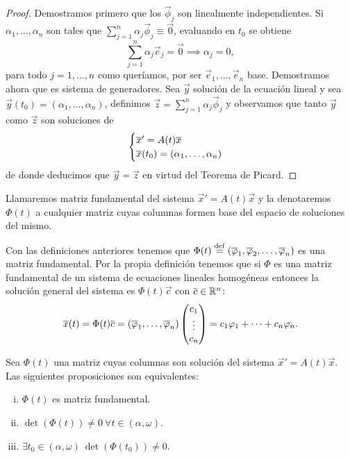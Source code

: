 \documentclass[../ecuaciones_diferenciales.tex]{subfiles}
\begin{document}
\begin{proof}
	Demostramos primero que los \(\vec{\phi}_j\) son linealmente independientes. 
	Si \(\alpha_1, \dots, \alpha_n\) son tales que 
	\(\sum_{j = 1}^n \alpha_j \vec{\phi}_j \equiv \vec{0}\),
	evaluando en \(t_0\) se obtiene
	\[\sum_{j = 1}^n \alpha_j \vec{e}_j = \vec{0} \implies \alpha_j = 0,\]
	para todo \(j = 1, \dots, n\) como queríamos, por ser 
	\(\vec{e}_1, \dots, \vec{e}_n\) base. 
	Demostramos ahora que es sistema de generadores. Sea \(\vec{y}\) solución
	de la ecuación lineal y sea 
	\(\vec{y}(t_0) = (\alpha_1, \dots, \alpha_n)\),
	definimos \(\vec{z} = \sum_{j = 1}^n \alpha_j \vec{\phi}_j\) y observamos 
	que tanto \(\vec{y}\) como \(\vec{z}\) son soluciones de
	\[\begin{cases}
		\overline{x}' = A(t)\overline{x} \\
		\overline{x}(t_0) = (\alpha_1, \dots, \alpha_n)\end{cases}\]
	de donde deducimos que \(\vec{y} = \vec{z}\) en virtud del 
	Teorema de Picard.
\end{proof}

\begin{definition}
	Llamaremos matriz fundamental del sistema 
	\(\vec{x}' = A(t)\vec{x}\) y la denotaremos
	\(\Phi(t)\) a cualquier matriz cuyas columnas formen base del espacio de
	soluciones del mismo.
\end{definition}

Con las definiciones anteriores tenemos que
\(\Phi(t) \overset{\operatorname{def}}{=} (\overline{\varphi}_1, \overline{\varphi}_2, \dots, \overline{\varphi}_n)\) es una matriz 
fundamental. Por la propia definición tenemos que si \(\Phi\) es una matriz 
fundamental de un sistema de ecuaciones lineales homogéneas entonces la solución 
general del sistema es \(\Phi(t)\vec{c}\) con \(\overline{c} \in \mathbb{R}^n\):
\[\overline{x}(t) = \Phi(t) \overline{c} 
	= (\overline{\varphi}_1, \dots, \overline{\varphi}_n) \begin{pmatrix}c_1 \\ \vdots \\ c_n\end{pmatrix} =
	c_1\varphi_1 + \cdots + c_n\varphi_n.\]

\begin{corollary}
	Sea \(\Phi(t)\) una matriz cuyas columnas son solución del sistema
	\(\vec{x}' = A(t)\vec{x}\). Las siguientes proposiciones son equivalentes:
	\begin{multicols}{2}
	\begin{enumerate}[i)]
		\item \(\Phi(t)\) es matriz fundamental.

		\item \(\det(\Phi(t)) \neq 0 \ \forall t \in (\alpha, \omega)\).

		\item \(\exists t_0 \in (\alpha, \omega) \ \det(\Phi(t_0)) \neq 0\).
	\end{enumerate}
	\end{multicols}
\end{corollary}
\end{document}

